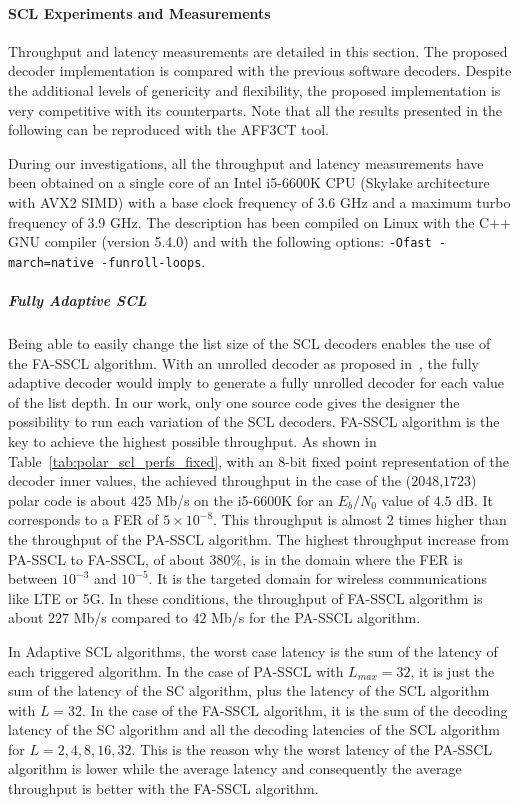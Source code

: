 \paragraph{SCL Experiments and Measurements}

Throughput and latency measurements are detailed in this section. The proposed
decoder implementation is compared with the previous software decoders. Despite
the additional levels of genericity and flexibility, the proposed implementation
is very competitive with its counterparts. Note that all the results presented
in the following can be reproduced with the AFF3CT tool.

During our investigations, all the throughput and latency measurements have been
obtained on a single core of an Intel i5-6600K CPU (Skylake architecture with
AVX2 SIMD) with a base clock frequency of 3.6 GHz and a maximum turbo frequency
of 3.9 GHz. The description has been compiled on Linux with the C++ GNU compiler
(version 5.4.0) and with the following options:
\texttt{-Ofast -march=native -funroll-loops}.

\subparagraph{Fully Adaptive SCL}

Being able to easily change the list size of the SCL decoders enables the use of
the FA-SSCL algorithm. With an unrolled decoder as proposed
in~\cite{Sarkis2016}, the fully adaptive decoder would imply to generate a fully
unrolled decoder for each value of the list depth. In our work, only one source
code gives the designer the possibility to run each variation of the SCL
decoders. FA-SSCL algorithm is the key to achieve the highest possible
throughput. As shown in Table~\ref{tab:polar_scl_perfs_fixed}, with an 8-bit fixed point
representation of the decoder inner values, the achieved throughput in the case
of the ($2048$,$1723$) polar code is about $425$ Mb/s on the i5-6600K for an
$E_b/N_0$ value of $4.5$ dB. It corresponds to a FER of $5\times10^{-8}$. This
throughput is almost 2 times higher than the throughput of the PA-SSCL
algorithm. The highest throughput increase from PA-SSCL to FA-SSCL, of
about $380\%$, is in the domain where the FER is between $10^{-3}$ and
$10^{-5}$. It is the targeted domain for wireless communications like LTE or 5G.
In these conditions, the throughput of FA-SSCL algorithm is about $227$ Mb/s
compared to $42$ Mb/s for the PA-SSCL algorithm.

In Adaptive SCL algorithms, the worst case latency is the sum of the latency of
each triggered algorithm. In the case of PA-SSCL with $L_{max}=32$, it is just
the sum of the latency of the SC algorithm, plus the latency of the SCL
algorithm with $L=32$. In the case of the FA-SSCL algorithm, it is the sum of
the decoding latency of the SC algorithm and all the decoding latencies of the
SCL algorithm for $L={2,4,8,16,32}$. This is the reason why the worst latency of
the PA-SSCL algorithm is lower while the average latency and consequently the
average throughput is better with the FA-SSCL algorithm.

